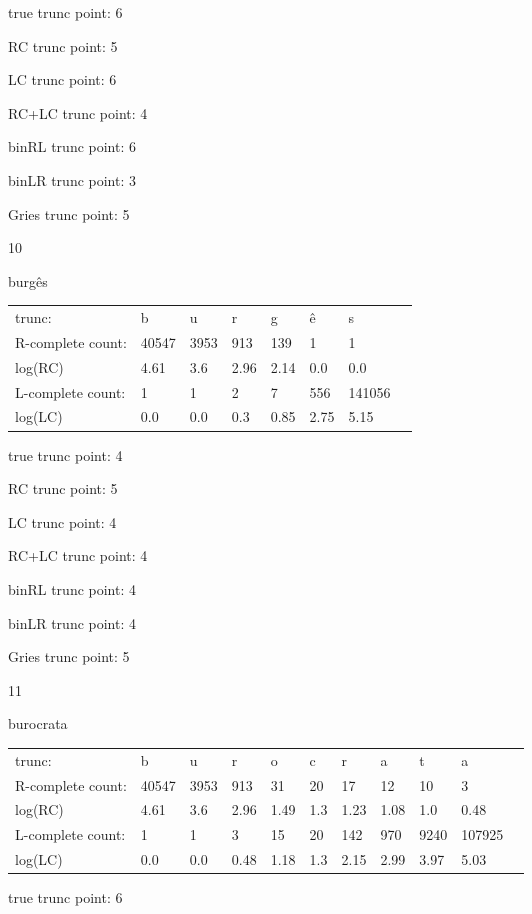 \documentclass[10pt]{article}
\begin{document}
true trunc point: 6

RC trunc point: 5

LC trunc point: 6

RC+LC trunc point: 4

binRL trunc point: 6

binLR trunc point: 3

Gries trunc point: 5

\vspace{1em}

10

burgês

\begin{tabular}{l|lllllll}
trunc: & b & u & r & g & ê & s & \\ 
R-complete count: & 40547 & 3953 & 913 & 139 & 1 & 1 & \\ 
log(RC) & 4.61 & 3.6 & 2.96 & 2.14 & 0.0 & 0.0 & \\ 
L-complete count: & 1 & 1 & 2 & 7 & 556 & 141056 & \\ 
log(LC) & 0.0 & 0.0 & 0.3 & 0.85 & 2.75 & 5.15 & \\ 
\end{tabular}

true trunc point: 4

RC trunc point: 5

LC trunc point: 4

RC+LC trunc point: 4

binRL trunc point: 4

binLR trunc point: 4

Gries trunc point: 5

\vspace{1em}

11

burocrata

\begin{tabular}{l|llllllllll}
trunc: & b & u & r & o & c & r & a & t & a & \\ 
R-complete count: & 40547 & 3953 & 913 & 31 & 20 & 17 & 12 & 10 & 3 & \\ 
log(RC) & 4.61 & 3.6 & 2.96 & 1.49 & 1.3 & 1.23 & 1.08 & 1.0 & 0.48 & \\ 
L-complete count: & 1 & 1 & 3 & 15 & 20 & 142 & 970 & 9240 & 107925 & \\ 
log(LC) & 0.0 & 0.0 & 0.48 & 1.18 & 1.3 & 2.15 & 2.99 & 3.97 & 5.03 & \\ 
\end{tabular}

true trunc point: 6
\end{document}
